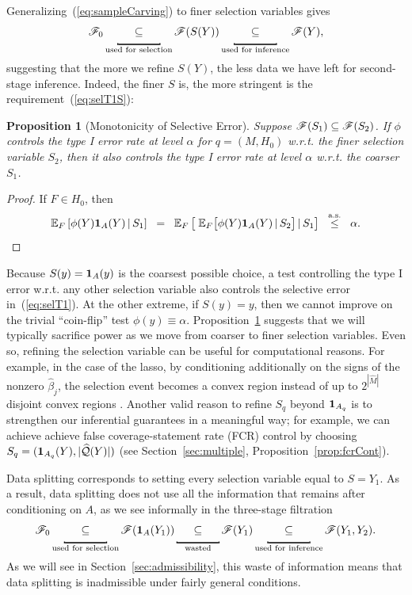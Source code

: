 \documentclass{article}
\newtheorem{proposition}[theorem]{Proposition}
\theoremstyle{definition}
\newcommand{\hcQ}{\widehat{\mathcal{Q}}}
\newcommand{\sF}{\mathscr{F}}
\newcommand{\hM}{\widehat{M}}
\newcommand{\leqAS}{\overset{\textrm{a.s.}}{\leq}}
\newcommand*\mystrut{\vrule width0pt height0pt depth1.5ex\relax}
\newcommand{\underlabel}{\underbracket[1pt][.5pt]{\mystrut \quad\;\; \sub \quad\;\; }}
\newcommand{\sampOrData}{data }
\newcommand{\capSampOrData}{Data }
\begin{document}
Generalizing~(\ref{eq:sampleCarving}) to finer selection variables gives
\begin{equation}\label{eq:sampleCarvingS}
  \sF_0 \underlabel_{\text{used for selection}} \sF(S(Y))
  \underlabel_{\text{used for inference}} \sF(Y),
\end{equation}
suggesting that the more we refine $S(Y)$, the less data we have left for second-stage inference. Indeed, the finer $S$ is, the more stringent is the requirement~(\ref{eq:selT1S}):
\begin{proposition}[Monotonicity of Selective Error]\label{prop:fineCont}
  Suppose $\sF(S_{1}) \sub \sF(S_{2})$. If $\phi$ controls the type I error rate at level $\alpha$ for $q=(M,H_0)$ w.r.t. the finer selection variable $S_{2}$, then it also controls the type I error rate at level $\alpha$ w.r.t. the coarser $S_{1}$.
\end{proposition}
\begin{proof}
If $F\in H_0$, then
\begin{equation*}
  \E_F\left[\phi(Y)\1_{A}(Y) \gv S_{1}\right] \;\;=\;\; \E_F\left[\;\E_F\big[\phi(Y)\1_{A}(Y) \gv S_{2}\big] \gv S_{1}\right] \;\;\leqAS\;\; \alpha.
\end{equation*}
\end{proof}
Because $S(y) = \mathbf{1}_A(y)$ is the coarsest possible choice, a test controlling the type I error w.r.t. any other selection variable also controls the selective error in~(\ref{eq:selT1}). At the other extreme, if $S(y) = y$, then we cannot improve on the trivial ``coin-flip'' test $\phi(y)\equiv \alpha$. Proposition~\ref{prop:fineCont} suggests that we will typically sacrifice power as we move from coarser to finer selection variables.
Even so, refining the selection variable can be useful for computational reasons. For example, in the case of the lasso, by conditioning additionally on the signs of the nonzero $\hat\beta_j$, the selection event becomes a convex region instead of up to $2^{|\hM|}$ disjoint convex regions \citep{lee2013exact}. Another valid reason to refine $S_q$ beyond $\mathbf{1}_{A_q}$ is to strengthen our inferential guarantees in a meaningful way; for example, we can achieve achieve false coverage-statement rate (FCR) control by choosing $S_q=(\1_{A_q}(Y),|\hcQ(Y)|)$ (see Section~\ref{sec:multiple}, Proposition~\ref{prop:fcrCont}).

\capSampOrData splitting corresponds to setting every selection variable equal to $S = Y_{1}$. As a result, \sampOrData splitting does not use all the information that remains after conditioning on $A$, as we see informally in the three-stage filtration
\begin{equation}\label{eq:ssWaste}
  \sF_0 \underlabel_{\text{used for selection}} \sF(\1_{A}(Y_{1}))
  \underlabel_{\text{wasted}} \sF(Y_{1})
  \underlabel_{\text{used for inference}} \sF(Y_{1}, Y_{2}).
\end{equation}
As we will see in Section~\ref{sec:admissibility}, this waste of information means that \sampOrData splitting is inadmissible under fairly general conditions.
\end{document}
